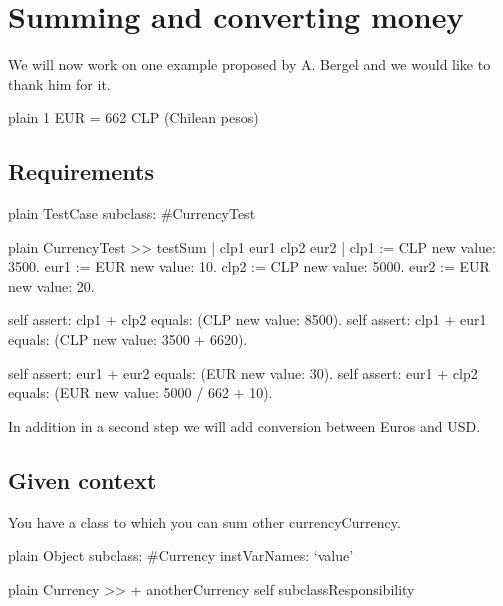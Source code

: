 \documentclass[10pt,twoside,english]{_support/latex/sbabook/sbabook}
\begin{document}
\frontmatter
\pagestyle{plain}

\tableofcontents*
\clearpage\listoffigures

\mainmatter

\chapter{Summing and converting money}
We will now work on one example proposed by A. Bergel and we would like to thank him for it. 

\begin{displaycode}{plain}
1 EUR = 662 CLP (Chilean pesos) 
\end{displaycode}
\section{Requirements}
	

\begin{displaycode}{plain}
TestCase subclass: #CurrencyTest 
\end{displaycode}

\begin{displaycode}{plain}
CurrencyTest >> testSum 
   | clp1 eur1 clp2 eur2 |
   clp1 := CLP new value: 3500.
   eur1 := EUR new value: 10.
   clp2 := CLP new value: 5000.
   eur2 := EUR new value: 20.

   self assert: clp1 + clp2 equals: (CLP new value: 8500). 
   self assert: clp1 + eur1 equals: (CLP new value: 3500 + 6620).
   
   self assert: eur1 + eur2 equals: (EUR new value: 30).
   self assert: eur1 + clp2 equals: (EUR new value: 5000 / 662 + 10).
\end{displaycode}

In addition in a second step we will add conversion between Euros and USD. 
\section{Given context}
You have a class  to which you can sum other currencyCurrency. 

\begin{displaycode}{plain}
Object subclass: #Currency 
	instVarNames: ‘value’ 
\end{displaycode}

\begin{displaycode}{plain}
Currency >> + anotherCurrency 
   self subclassResponsibility 
\end{displaycode}
\end{document}
